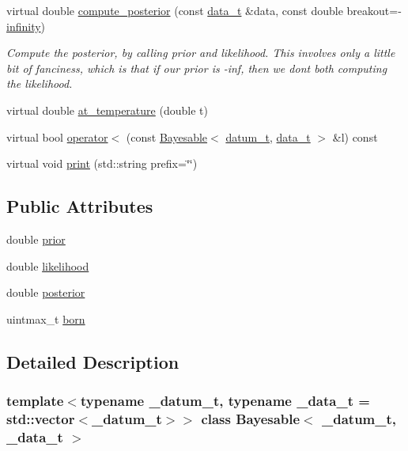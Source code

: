 \begin{DoxyCompactItemize}
virtual double \hyperlink{class_bayesable_a0b0552923602bcab6c768581ab8c7df8}{compute\+\_\+posterior} (const \hyperlink{class_bayesable_aa2788c4d7718c0a824e1d28c4c98f921}{data\+\_\+t} \&data, const double breakout=-\/\hyperlink{_numerics_8h_af9434aea82baf2f6a5d9b6f9e36db08e}{infinity})
\begin{DoxyCompactList}\small\item\em Compute the posterior, by calling prior and likelihood. This involves only a little bit of fanciness, which is that if our prior is -\/inf, then we don\textquotesingle{}t both computing the likelihood. \end{DoxyCompactList}\item 
virtual double \hyperlink{class_bayesable_acf805473a9eea0df96d6267dca0e9c87}{at\+\_\+temperature} (double t)
\item 
virtual bool \hyperlink{class_bayesable_ac356e7e5b11c266b8442064186dbe89d}{operator$<$} (const \hyperlink{class_bayesable}{Bayesable}$<$ \hyperlink{class_bayesable_a9f1a6c0cd7855550fa10b1a8f13a5867}{datum\+\_\+t}, \hyperlink{class_bayesable_aa2788c4d7718c0a824e1d28c4c98f921}{data\+\_\+t} $>$ \&l) const
\item 
virtual void \hyperlink{class_bayesable_a87d5d9481d6a72b017e44b175071fa5e}{print} (std\+::string prefix=\char`\"{}\char`\"{})
\end{DoxyCompactItemize}
\subsection*{Public Attributes}
\begin{DoxyCompactItemize}
\item 
double \hyperlink{class_bayesable_a473790922c2dd73e227350d029d73003}{prior}
\item 
double \hyperlink{class_bayesable_a4d1a9ed826013bf079cea1867b6d4183}{likelihood}
\item 
double \hyperlink{class_bayesable_a268442b9aae5b763c17ca29c39231915}{posterior}
\item 
uintmax\+\_\+t \hyperlink{class_bayesable_a898e03a20e1851c868b77ef4e844f0bf}{born}
\end{DoxyCompactItemize}


\subsection{Detailed Description}
\subsubsection*{template$<$typename \+\_\+datum\+\_\+t, typename \+\_\+data\+\_\+t = std\+::vector$<$\+\_\+datum\+\_\+t$>$$>$\newline
class Bayesable$<$ \+\_\+datum\+\_\+t, \+\_\+data\+\_\+t $>$}

